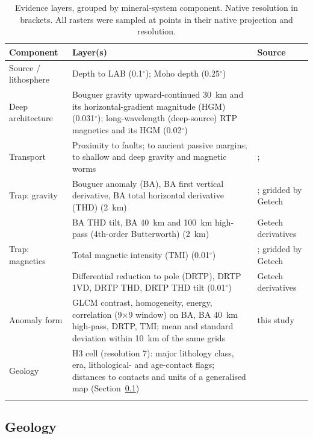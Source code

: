 \documentclass[pdflatex,sn-apa]{sn-jnl}
\begin{document}
\begin{table}[t]
\caption{Evidence layers, grouped by mineral-system component. Native resolution in brackets. All rasters were sampled at points in their native projection and resolution.}\label{tab:layers}
\footnotesize
\begin{tabular*}{\textwidth}{@{\extracolsep\fill}p{2.3cm}p{6.0cm}p{3.2cm}}
\toprule
Component & Layer(s) & Source \\
\midrule
Source / lithosphere & Depth to LAB (0.1$^\circ$); Moho depth (0.25$^\circ$) & \citet{McCafferty2023} \\
Deep architecture & Bouguer gravity upward-continued 30~km and its horizontal-gradient magnitude (HGM) (0.031$^\circ$); long-wavelength (deep-source) RTP magnetics and its HGM (0.02$^\circ$) & \citet{McCafferty2023} \\
Transport & Proximity to faults; to ancient passive margins; to shallow and deep gravity and magnetic worms & \citet{McCafferty2023}; \citet{BradleyDC2008} \\
Trap: gravity & Bouguer anomaly (BA), BA first vertical derivative, BA total horizontal derivative (THD) (2~km) & \citet{Jobin2017}; gridded by Getech \\
 & BA THD tilt, BA 40~km and 100~km high-pass (4th-order Butterworth) (2~km) & Getech derivatives \\
Trap: magnetics & Total magnetic intensity (TMI) (0.01$^\circ$) & \citet{Miles2016}; gridded by Getech \\
 & Differential reduction to pole (DRTP), DRTP 1VD, DRTP THD, DRTP THD tilt (0.01$^\circ$) & Getech derivatives \\
Anomaly form & GLCM contrast, homogeneity, energy, correlation (9$\times$9 window) on BA, BA 40~km high-pass, DRTP, TMI; mean and standard deviation within 10~km of the same grids & this study \\
Geology & H3 cell (resolution 7): major lithology class, era, lithological- and age-contact flags; distances to contacts and units of a generalised map (Section~\ref{sec:featuresets}) & \citet{Wheeler1996} \\
\botrule
\end{tabular*}
\end{table}

\subsection{Geology}\label{sec:featuresets}
\end{document}

